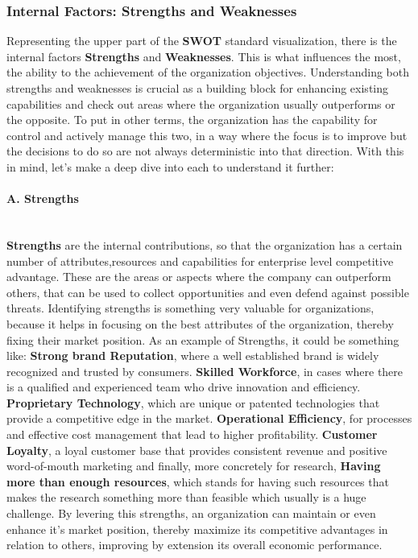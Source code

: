 \subsubsection{Internal Factors: Strengths and Weaknesses}
Representing the upper part of the \textbf{SWOT} standard visualization, there is the internal factors \textbf{Strengths} and \textbf{Weaknesses}. This is what influences the most, the ability to the achievement of the organization objectives. Understanding both strengths and weaknesses is crucial as a building block for enhancing existing capabilities and check out areas where the organization usually outperforms or the opposite. To put in other terms, the organization has the capability for control and actively manage this two, in a way where the focus is to improve but the decisions to do so are not always deterministic into that direction. With this in mind, let's make a deep dive into each to understand it further:

\paragraph{A. Strengths}\mbox{}\\
\textbf{Strengths} are the internal contributions, so that the organization has a certain number of attributes,resources and capabilities for enterprise level competitive advantage. These are the areas or aspects where the company can outperform others, that can be used to collect opportunities and even defend against possible threats. Identifying strengths is something very valuable for organizations, because it helps in focusing on the best attributes of the organization, thereby fixing their market position.
As an example of Strengths, it could be something like: \textbf{Strong brand Reputation}, where a well established brand is widely recognized and trusted by consumers. \textbf{Skilled Workforce}, in cases where there is a qualified and experienced team who drive innovation and efficiency. \textbf{Proprietary Technology}, which are unique or patented technologies that provide a competitive edge in the market. \textbf{Operational Efficiency}, for processes and effective cost management that lead to higher profitability. \textbf{Customer Loyalty}, a loyal customer base that provides consistent revenue and positive word-of-mouth marketing and finally, more concretely for research, \textbf{Having more than enough resources}, which stands for having such resources that makes the research something more than feasible which usually is a huge challenge.
By levering this strengths, an organization can maintain or even enhance it's market position, thereby maximize its competitive advantages in relation to others, improving by extension its overall economic performance.

